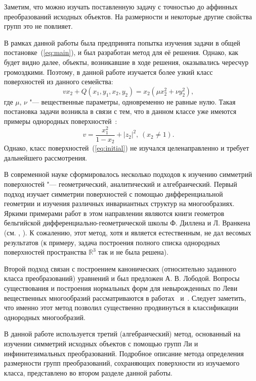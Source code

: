 \documentclass[../main.tex]{subfiles}
\begin{document}
Заметим, что можно изучать поставленную задачу с точностью до аффинных преобразований исходных объектов. На размерности и некоторые другие свойства групп это не повлияет.

В рамках данной работы была предпринята попытка изучения задачи в общей постановке~(\ref{eq:main}), и был разработан метод для её решения. Однако, как будет видно далее, объекты, возникавшие в ходе решения, оказывались чересчур громоздкими. Поэтому, в данной работе изучается более узкий класс поверхностей из данного семейства:
\begin{equation}\label{eq:initial}
v x_2 + Q(x_1, y_1, x_2, y_2) = x_2 (\mu x_2^2 + \nu y_2^2),
\end{equation}
где $\mu$, $\nu$ "--- вещественные параметры, одновременно не равные нулю. Такая постановка задачи возникла в связи с тем, что в данном классе уже имеются примеры однородных поверхностей~\cite{ALS}:
\begin{equation}\label{eq:homogenous}
v = \frac{x_1^2}{1 - x_2} + |z_2|^2,\ (x_2 \ne 1).
\end{equation}
Однако, класс поверхностей~(\ref{eq:initial}) не изучался целенаправленно и требует дальнейшего рассмотрения.

В современной науке сформировалось несколько подходов к изучению симметрий поверхностей "--- геометрический, аналитический и алгебраический. Первый подход изучает симметрии поверхностей с помощью дифференциальной геометрии и изучения различных инвариантных структур на многообразиях. Яркими примерами работ в этом направлении являются книги геометров бельгийской дифференциально-геометрической школы Ф. Диллена и Л. Вранкена (см. \cite{dillen}, \cite{vrancken}). К сожалению, этот метод, хотя и является естественным, не дал весомых результатов (к примеру, задача построения полного списка однородных поверхностей пространства $\mathbb{R}^3$ так и не была решена).

Второй подход связан с построением канонических (относительно заданного класса преобразований) уравнений и был предложен А. В. Лободой. Вопросы существования и построения нормальных форм для невырожденных по Леви вещественных многообразий рассматриваются в работах~\cite{loboda_hodarev} и~\cite{danilov}. Следует заметить, что именно этот метод позволил существенно продвинуться в классификации однородных многообразий.

В данной работе используется третий (алгебраический) метод, основанный на изучении симметрий исходных объектов с помощью групп Ли и инфинитезимальных преобразований. Подробное описание метода определения размерности групп преобразований, сохраняющих поверхности из изучаемого класса, представлено во втором разделе данной работы.
\end{document}
